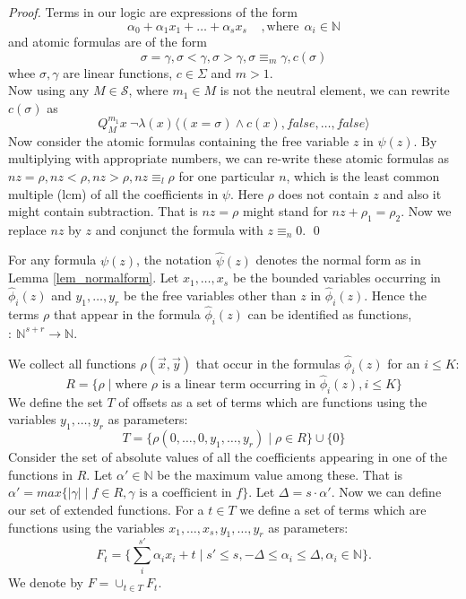 \documentclass[envcountsame]{llncs}
\newcommand{\Nat}{\mathbb{N}}
\newcommand{\mon}[2]{Q_{#1}^{#2}}
\begin{document}
\begin{proof}
Terms in our logic are expressions of the form $$\alpha_0+\alpha_1x_1+\dots+\alpha_s x_s ~~~~~, \mbox{where} ~~\alpha_i \in \Nat$$ and atomic formulas are of the form
$$\sigma = \gamma, \sigma < \gamma, \sigma > \gamma, \sigma \equiv_m \gamma, c(\sigma)$$
whee $\sigma, \gamma$ are linear functions, $c \in \Sigma$ and $m > 1$. \\
Now using any $M \in \mathcal{S}$, where $m_1\in M$ is not the neutral element, we can rewrite $c(\sigma)$ as
$$\mon{M}{m_1} x ~\neg \lambda(x) \langle (   x = \sigma) \wedge c(x), false,\dots,false\rangle$$
Now consider the atomic formulas containing the free variable $z$ in $\psi(z)$. 
By multiplying with appropriate numbers, we can re-write these atomic formulas as $nz = \rho, nz < \rho, nz > \rho, nz \equiv_l \rho$ 
for one particular $n$, which is the least common multiple (lcm) of all the coefficients in $\psi$. Here $\rho$ does not contain $z$ and also it might contain subtraction. That is $nz=\rho$ might stand for $nz+\rho_1 = \rho_2$. Now we replace $nz$ by $z$ and 
conjunct the formula with $z \equiv_n 0$. 
\qed \end{proof}

For any formula $\psi(z)$, the notation $\hat \psi(z)$ denotes the normal form as in Lemma \ref{lem_normalform}.
Let $x_1,\dots,x_s$ be the bounded variables occurring in $\hat\phi_i(z)$ and $y_1,\dots,y_r$  be the free variables other than $z$ in $\hat\phi_i(z)$.
Hence the terms $\rho$ that appear in the formula $\hat\phi_i(z)$ can be identified as functions, $: ~\mathbb N^{s+r}\rightarrow\mathbb N$.

We collect all functions $\rho(\vec x,\vec y)$ that occur in the formulas $\hat\phi_i(z)$ for an $i\leq K$:  
$$R=\{\rho\mid \text{where $\rho$ is a linear term occurring in $\hat\phi_i(z)$}, i\leq K\}$$
We define the set $T$ of offsets as a set of terms which are functions using the variables $y_1,\dots,y_r$ as parameters:
$$T=\{\rho(0,\dots,0,y_1,\dots,y_r)\mid \rho\in R\}\cup\{0\}$$
Consider the set of absolute values of all the coefficients appearing in one of the functions in $R$. Let $\alpha' \in \Nat$ be the maximum value among these. That is 
$\alpha' = max \{ |\gamma| \mid f \in R, \gamma \mbox{ is a coefficient in } f\}$. Let $\Delta=s\cdot\alpha'$.
Now we can define our set of extended functions.
For a $t \in T$ we define a set of terms which are functions using the variables $x_1,\dots,x_s,y_1,\dots,y_r$ as parameters:
$$F_t=\big\{\sum_i^{s'} \alpha_i x_i + t\mid s'\leq s,-\Delta \leq \alpha_i\leq\Delta, \alpha_i \in \mathbb{N}\big\}.$$
We denote by $F=\cup_{t \in T} F_t$.
\end{document}
